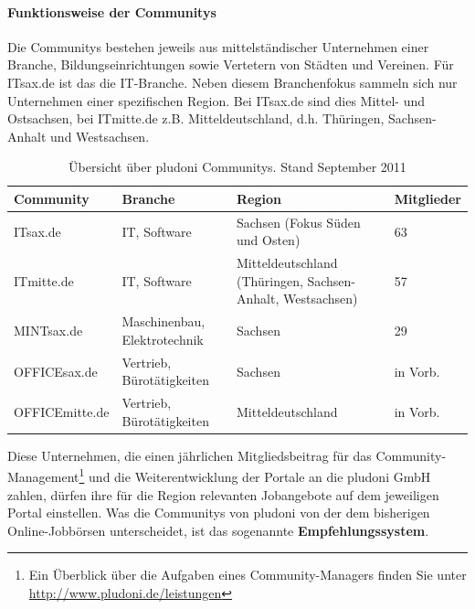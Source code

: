 \paragraph{Funktionsweise der Communitys}
Die Communitys bestehen jeweils aus mittelständischer Unternehmen einer Branche, Bildungseinrichtungen sowie Vertetern von Städten und Vereinen. Für ITsax.de ist das die IT-Branche. Neben diesem Branchenfokus sammeln sich nur Unternehmen einer spezifischen Region. Bei ITsax.de sind dies Mittel- und Ostsachsen, bei ITmitte.de z.B. Mitteldeutschland, d.h. Thüringen, Sachsen-Anhalt und Westsachsen.
\begin{table}[htbp]
\label{tb:dt}
\caption{Übersicht über pludoni Communitys. Stand September 2011}
\begin{tabular}{|l|p{3.8cm}|p{5cm}|l|}
\hline
\rowcolor{Gray}
Community & Branche & Region & Mitglieder \\\hline
ITsax.de & IT, Software &  Sachsen (Fokus Süden und Osten) & 63\\\hline
ITmitte.de & IT, Software &  Mitteldeutschland (Thüringen, Sachsen-Anhalt, Westsachsen) & 57 \\\hline
MINTsax.de & Maschinenbau, Elektrotechnik &  Sachsen & 29\\\hline
OFFICEsax.de & Vertrieb, Bürotätigkeiten &  Sachsen & in Vorb.\\\hline
OFFICEmitte.de & Vertrieb, Bürotätigkeiten &  Mitteldeutschland & in Vorb.\\\hline
\end{tabular}
\end{table}



Diese Unternehmen, die einen jährlichen Mitgliedsbeitrag für das Community\hyp{}Management\footnote{Ein Überblick über die Aufgaben eines Community-Managers finden Sie unter \url{http://www.pludoni.de/leistungen}} und die Weiterentwicklung der Portale an die pludoni GmbH zahlen, dürfen ihre für die Region relevanten Jobangebote auf dem jeweiligen Portal einstellen. Was die Communitys von pludoni von der dem bisherigen Online-Jobbörsen unterscheidet, ist das sogenannte \textbf{Empfehlungssystem}.

